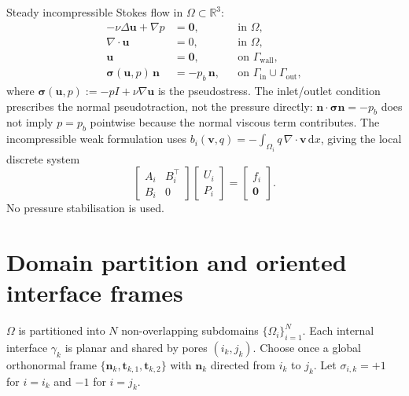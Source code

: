 \documentclass[11pt,a4paper]{article}
\newcommand{\R}{\mathbb{R}}
\newcommand{\dom}{\Omega}
\newcommand{\pore}[1]{\Omega_{#1}}
\newcommand{\iface}{\gamma}
\newcommand{\vel}{\bm{u}}
\newcommand{\pres}{p}
\newcommand{\stress}{\bm{\sigma}}
\newcommand{\normal}{\bm{n}}
\newcommand{\zero}{\bm{0}}
\begin{document}
Steady incompressible Stokes flow in $\dom \subset \R^3$:
\begin{align}
  -\nu\Delta\vel + \nabla\pres &= \zero,                && \text{in } \dom,\\
  \nabla\cdot\vel &= 0,                                   && \text{in } \dom,\\
  \vel &= \zero,                                          && \text{on } \Gamma_{\text{wall}},\\
  \stress(\vel,\pres)\,\normal &= -p_b\,\normal,         && \text{on } \Gamma_{\text{in}}\cup\Gamma_{\text{out}},
\end{align}
where $\stress(\vel,\pres) := -\pres I + \nu\nabla\vel$ is the pseudostress.
The inlet/outlet condition prescribes the normal pseudotraction, not the
pressure directly: $\normal\cdot\stress\normal = -p_b$ does not imply
$\pres = p_b$ pointwise because the normal viscous term contributes.
The incompressible weak formulation uses
$b_i(\bm{v},q) = -\int_{\pore{i}} q\,\nabla\cdot\bm{v}\,\mathrm{d}x$,
giving the local discrete system
\begin{equation}\label{eq:local-fe}
  \begin{bmatrix} A_i & B_i^\top \\ B_i & 0 \end{bmatrix}
  \begin{bmatrix} U_i \\ P_i \end{bmatrix}
  = \begin{bmatrix} f_i \\ \zero \end{bmatrix}.
\end{equation}
No pressure stabilisation is used.

\section{Domain partition and oriented interface frames}

$\dom$ is partitioned into $N$ non-overlapping subdomains
$\{\pore{i}\}_{i=1}^N$.  Each internal interface $\iface_k$ is planar
and shared by pores $(i_k,j_k)$.  Choose once a global orthonormal frame
$\{\normal_k,\bm{t}_{k,1},\bm{t}_{k,2}\}$ with $\normal_k$ directed from
$i_k$ to $j_k$.  Let $\sigma_{i,k}=+1$ for $i=i_k$ and $-1$ for $i=j_k$.
\end{document}
